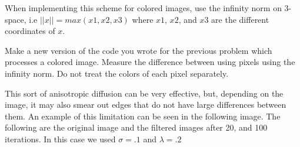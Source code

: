 When implementing this scheme for colored images, use the infinity norm on 3-space, i.e $||x||=max(x1,x2,x3)$ where $x1$, $x2$, and $x3$ are the different coordinates of $x$.

\begin{problem}
Make a new version of the code you wrote for the previous problem which processes a colored image.
Measure the difference between using pixels using the infinity norm.
Do not treat the colors of each pixel separately.
\end{problem}

This sort of anisotropic diffusion can be very effective, but, depending on the image, it may also smear out edges that do not have large differences between them.
An example of this limitation can be seen in the following image.
The following are the original image and the filtered images after 20, and 100 iterations.
In this case we used $\sigma = .1$ and $\lambda = .2$

